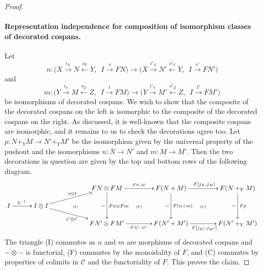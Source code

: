 \begin{proof}
\paragraph{Representation independence for composition of isomorphism
classes of decorated cospans.}
Let 
\[
  n\colon  \big(X \stackrel{i_X}\longrightarrow N \stackrel{o_Y}\longleftarrow Y,\enspace I
\stackrel{s}\longrightarrow FN\big) \longrightarrow \big(X \stackrel{i'_X}\longrightarrow N'
\stackrel{o'_Y}\longleftarrow Y,\enspace I \stackrel{s'}\longrightarrow FN'\big)
\]
and
\[
  m\colon  \big(Y \stackrel{i_Y}\longrightarrow M \stackrel{o_Z}\longleftarrow Z,\enspace I
\stackrel{t}\longrightarrow FM\big) \longrightarrow \big(Y \stackrel{i'_Y}\longrightarrow M'
\stackrel{o'_Z}\longleftarrow Z,\enspace I \stackrel{t'}\longrightarrow FM'\big)
\]
be isomorphisms of decorated cospans. We wish to show that the composite of the
decorated cospans on the left is isomorphic to the composite of the decorated
cospans on the right. As discussed, it is well-known that the composite cospans
are isomorphic, and it remains to us to check the decorations agree too. Let $p\colon 
N+_YM \to N'+_YM'$ be the isomorphism given by the universal property of the
pushout and the isomorphisms $n\colon N \to N'$ and $m\colon  M \to M'$. Then the two
decorations in question are given by the top and bottom rows of the following
diagram.
\[
  \xymatrixrowsep{1pc}
  \xymatrixcolsep{1pc}
  \xymatrix{
    &&&& FN \otimes FM \ar[dd]^{Fn \otimes Fm}_\sim
    \ar[rr]^{\varphi_{N,M}} && F(N+M) \ar[dd]^{F(n+m)}_\sim
    \ar[rr]^{F[j_N,j_M]} && F(N+_YM) \ar[dd]^{Fp}_\sim \\ 
    I \ar[rr]^(.4){\lambda^{-1}} && I\otimes I \ar[urr]^{s \otimes t}
    \ar[drr]_{s' \otimes t'} &
    \qquad\textrm{\tiny(I)} && \textrm{\tiny(F)} && \textrm{\tiny(C)}\\ 
    &&&& FN' \otimes FM' \ar[rr]_{\varphi_{N',M'}} && F(N'+M')
    \ar[rr]_{F[j_{N'},j_{M'}]} && F(N'+_YM')
  }
\]
The triangle (I) commutes as $n$ and $m$ are morphisms of decorated cospans and
$- \otimes -$ is functorial, (F) commutes by the monoidality of $F$, and (C)
commutes by properties of colimits in $\mathcal C$ and the functoriality of $F$.
This proves the claim.


\end{proof}
